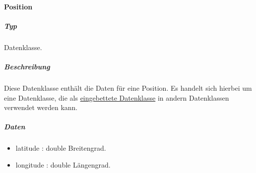 \paragraph{Position}
\subparagraph*{Typ}
Datenklasse.
\subparagraph*{Beschreibung}
Diese Datenklasse enthält die Daten für eine Position.
Es handelt sich hierbei um eine Datenklasse, die als \href{https://developer.android.com/reference/android/arch/persistence/room/Embedded}
{eingebettete Datenklasse} in andern Datenklassen verwendet werden kann. 
\subparagraph*{Daten}
\begin{itemize}
    \item latitude : double Breitengrad.
    \item longitude : double Längengrad.
\end{itemize}
